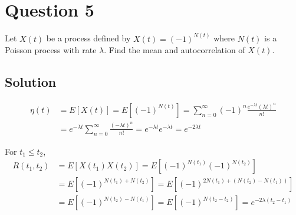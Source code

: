 \section*{Question 5}

Let \( X(t) \) be a process defined by \( X(t)=(-1)^{N(t)} \) where \( N(t) \) is a Poisson process with rate \( \lambda \).
Find the mean and autocorrelation of \( X(t) \).

\subsection*{Solution}

\begin{align*}
    \eta(t)
     & =
    E[X(t)]
    =
    E[(-1)^{N(t)}]
    =
    \sum_{n=0}^{\infty} (-1)^{n} \frac{e^{-\lambda t} (\lambda t)^{n}}{n!}
    \\ & =
    e^{-\lambda t} \sum_{n=0}^{\infty} \frac{(-\lambda t)^{n}}{n!}
    =
    e^{-\lambda t} e^{-\lambda t}
    =
    e^{-2\lambda t}
\end{align*}

For \( t_1 \leq t_2 \),
\begin{align*}
    R\left(t_{1}, t_{2}\right)
     & =
    E[X(t_{1})X(t_{2})]
    =
    E[(-1)^{N(t_{1})} (-1)^{N(t_{2})}]
    \\ & =
    E[(-1)^{N(t_{1})+N(t_{2})}]
    =
    E[(-1)^{2N(t_{1})+(N(t_{2})-N(t_{1}))}]
    \\ & =
    E[(-1)^{N(t_{2})-N(t_{1})}]
    =
    E[(-1)^{N(t_{2}-t_{2})}]
    =
    e^{-2\lambda(t_{2}-t_{1})}
\end{align*}
